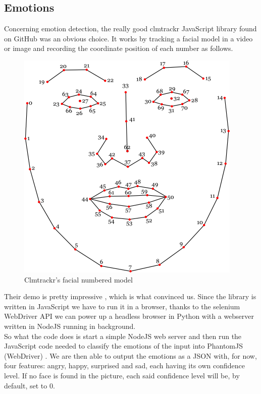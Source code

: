 \documentclass{article}
\begin{document}
    \subsection{Emotions}
        Concerning emotion detection, the really good clmtrackr JavaScript library found on GitHub \cite{clm} was an obvious choice. It works by tracking a facial model in a video or image and recording the coordinate position of each number as follows. 
        \begin{figure}[H]
            \centering
            \includegraphics[scale=0.7]{clm.png}
            \caption{Clmtrackr's facial numbered model}
        \end{figure}
        Their demo is pretty impressive \cite{clmdemo}, which is what convinced us. Since the library is written in JavaScript we have to run it in a browser, thanks to the selenium WebDriver API \cite{web} we can power up a headless browser in Python with a webserver written in NodeJS \cite{node} running in background.
        \\So what the code does is start a simple NodeJS web server and then run the JavaScript  code needed to classify the emotions of the input into PhantomJS (WebDriver) \cite{phan}. We are then able to output the emotions as a JSON with, for now, four features: angry, happy, surprised and sad, each having its own confidence level. If no face is found in the picture, each said confidence level will be, by default, set to 0.

\newpage
\end{document}
